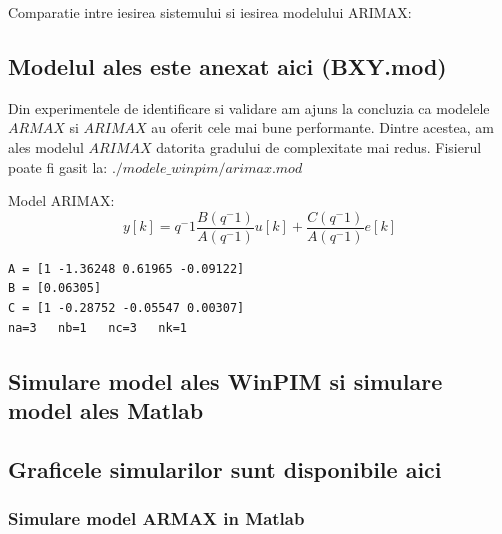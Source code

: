 \documentclass[12pt,english]{article}
\begin{document}
Comparatie intre iesirea sistemului si iesirea modelului ARIMAX:
\begin{center}
\end{center}

\subsection {Modelul ales este anexat aici (BXY.mod) }
Din experimentele de identificare si validare am ajuns la concluzia ca modelele $ARMAX$ si $ARIMAX$ au oferit cele mai bune performante. Dintre acestea, am ales modelul $ARIMAX$ datorita gradului de complexitate mai redus.
Fisierul poate fi gasit la: $./modele\_winpim/arimax.mod$

Model ARIMAX:
\[ y[k] = q^-1 \dfrac{B(q^-1)}{A(q^-1)}u[k] + \dfrac{C(q^-1)}{A(q^-1)}e[k] \]

\begin{lstlisting}
A = [1 -1.36248 0.61965 -0.09122]
B = [0.06305]
C = [1 -0.28752 -0.05547 0.00307]
na=3   nb=1   nc=3   nk=1
\end{lstlisting}

\subsection {Simulare model ales WinPIM si simulare model ales Matlab }
\subsection {Graficele simularilor sunt disponibile aici }
\subsubsection {Simulare model ARMAX in Matlab }
\begin{center}
\end{center}
\end{document}
